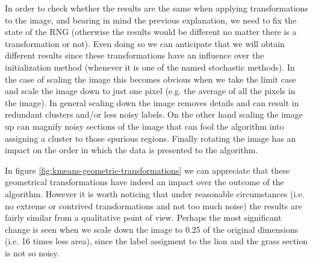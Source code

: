In order to check whether the results are the same when applying transformations to the
image, and bearing in mind the previous explanation, we need to fix the state of the RNG
(otherwise the results would be different no matter there is a transformation or not).
Even doing so we can anticipate that we will obtain different results since these
transformations have an influence over the initialization method (whenever it is one of the
named stochastic methods). In the case of scaling the image this becomes obvious when we
take the limit case and scale the image down to just one pixel (e.g. the average of all the
pixels in the image). In general scaling down the image removes details and can result in
redundant clusters and/or less noisy labels. On the other hand scaling the image up can
magnify noisy sections of the
image that can fool the algorithm into assigning a cluster to those spurious regions.
Finally rotating the image has an impact on the order in which
the data is presented to the algorithm.

In figure \ref{fig:kmeans-geometric-transformations} we can appreciate that these
geometrical transformations have indeed an impact over the outcome of the algorithm. However it is
worth noticing that under reasonable circumstances (i.e. no extreme or contrived
transformations and not too much noise) the results are fairly similar from a qualitative
point of view. Perhaps the most significant change is seen when we scale down the image to
0.25 of the original dimensions (i.e. 16 times less area), since the label assigment to
the lion and the grass section is not so noisy.

